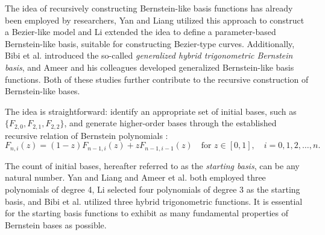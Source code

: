 \documentclass[preprint,12pt]{elsarticle}
\theoremstyle{definition}
\theoremstyle{theorem}
\theoremstyle{lemma}
\theoremstyle{example}
\theoremstyle{remark}
\theoremstyle{prop}
\begin{document}
The idea of recursively constructing Bernstein-like basis functions has already been employed by researchers,
 Yan and Liang \cite{yan2011extension} utilized this approach to construct a Bezier-like model and  Li \cite{li2018novel} extended the idea to define a parameter-based Bernstein-like basis, suitable for constructing Bezier-type curves. Additionally, Bibi et al. \cite{bibi2020geometric} introduced the so-called \textit{generalized hybrid trigonometric Bernstein basis}, and Ameer and his colleagues \cite{ameer2022novel} developed generalized Bernstein-like basis functions. Both of these studies further contribute to the recursive construction of Bernstein-like bases.

The idea is straightforward: identify an appropriate set of initial bases, such as $\{F_{2,0},F_{2,1},F_{2,2}\}$, and generate higher-order bases through the established recursive relation of Bernstein polynomials \cite{farin2002curves}:
  \begin{equation}
F_{n,i}(z) = (1-z)F_{n-1,i}(z) + zF_{n-1,i-1}(z) \quad \text{for } z \in [0,1], \quad i = 0, 1, 2, \ldots, n. \label{rec-rel}
\end{equation}

The count of initial bases, hereafter referred to as the \textit{starting basis}, can be any natural number. Yan and Liang \cite{yan2011extension} and Ameer et al. \cite{ameer2022novel} both employed three polynomials of degree 4, Li \cite{li2018novel} selected four polynomials of degree 3 as the starting basis, and Bibi et al. \cite{bibi2020geometric} utilized three hybrid trigonometric functions. It is essential for the starting basis functions to exhibit as many fundamental properties of Bernstein bases as possible.
\end{document}
